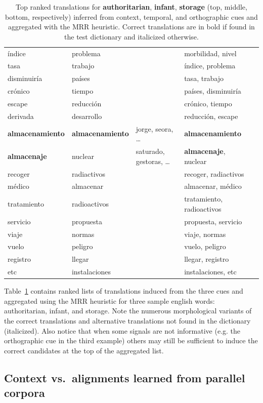 \documentclass{article}
\newcommand{\tabref}[1]{Table~\ref{#1}}
\begin{document}
\begin{table}[h!]
\begin{center}
\begin{tabular}{lllll}
índice	&	problema	&	&	morbilidad, nivel\\
tasa	&	trabajo	&	&	índice, problema\\
disminuiría	&	países	&	&	tasa, trabajo\\
cr\'{o}nico	&	tiempo	&	&	países, disminuiría\\
escape	&	reducci\'{o}n	&	&	 cr\'{o}nico, tiempo\\
derivada	&	desarrollo	&	&	reducci\'{o}n, escape\\
\hline
{\bf almacenamiento}	&	{\bf almacenamiento}	&	jorge, seora, \dots	&	{\bf almacenamiento}\\
{\bf almacenaje}	&	nuclear	&	saturado, gestoras, \dots	&	{\bf almacenaje}, nuclear\\
recoger	&	radiactivos	&	&	recoger, radiactivos\\
m\'{e}dico	&	almacenar	&	&	almacenar, m\'{e}dico\\
tratamiento	&	radioactivos	&	&	tratamiento, radioactivos\\
servicio	&	propuesta	&	&	propuesta, servicio\\
viaje	&	normas	&	&	viaje, normas\\
vuelo	&	peligro	&	&	vuelo, peligro\\
registro	&	llegar	&	&	llegar, registro\\
etc	&	instalaciones	&	&	instalaciones, etc\\
\end{tabular}
\end{center}
\normalsize
\caption{Top ranked translations for {\bf authoritarian}, {\bf infant}, {\bf storage} (top, middle, bottom, respectively) inferred from context, temporal, and orthographic cues and aggregated with the MRR heuristic.  Correct translations are in bold if found in the test dictionary and italicized otherwise.}
\label{fig:examplelists}
\end{table}

\tabref{fig:examplelists} contains ranked lists of translations induced from the three cues and aggregated using the MRR heuristic for three sample english words: authoritarian, infant, and storage.  Note the numerous morphological variants of the correct translations and alternative translations not found in the dictionary (italicized).  Also notice that when some signals are not informative (e.g. the orthographic cue in the third example) others may still be sufficient to induce the correct candidates at the top of the aggregated list.

\subsection{Context vs.\ alignments learned from parallel corpora} 
\end{document}

